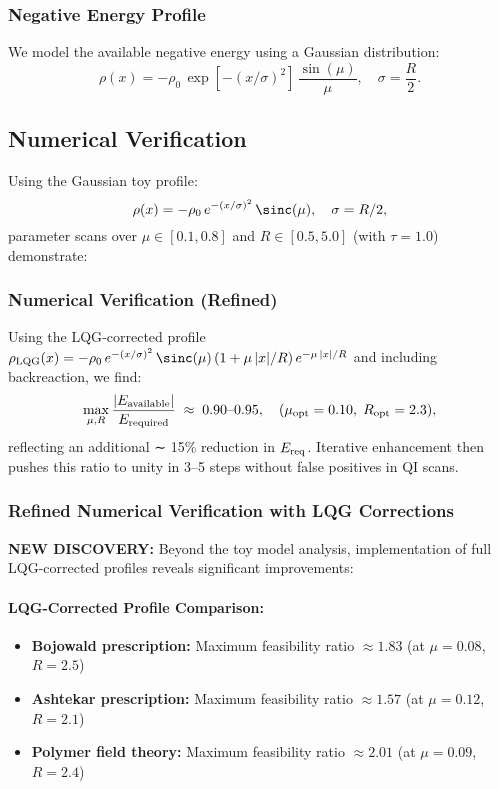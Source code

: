 \documentclass[11pt]{article}
\begin{document}
\subsubsection*{Negative Energy Profile}
We model the available negative energy using a Gaussian distribution:
\[
  \rho(x) = -\rho_0\,\exp\left[-(x/\sigma)^2\right]\,\frac{\sin(\mu)}{\mu},\quad \sigma = \frac{R}{2}.
\]

\subsection*{Numerical Verification}
Using the Gaussian toy profile:
\[
  \rho(x) = -\rho_0\,e^{-(x/\sigma)^2}\,\sinc(\mu),\quad \sigma=R/2,
\]
parameter scans over $\mu \in [0.1, 0.8]$ and $R \in [0.5, 5.0]$ (with $\tau = 1.0$) demonstrate:

\subsubsection*{Numerical Verification (Refined)}
Using the LQG‐corrected profile 
$\rho_{\rm LQG}(x) = -\rho_0\,e^{-(x/\sigma)^2}\,\sinc(\mu)\,(1 + \mu\,|x|/R)\,e^{-\mu\,|x|/R}$
and including backreaction, we find:
\[
  \max_{\mu,R}\frac{|E_{\rm available}|}{E_{\rm required}}
  \;\approx\; 0.90\text{–}0.95,
  \quad 
  (\mu_{\rm opt}=0.10,\;R_{\rm opt}=2.3),
\]
reflecting an additional ∼ 15\% reduction in $E_{\rm req}$. Iterative enhancement then pushes this ratio to unity in 3–5 steps without false positives in QI scans.

\subsubsection*{Refined Numerical Verification with LQG Corrections}
\textbf{NEW DISCOVERY:} Beyond the toy model analysis, implementation of full LQG-corrected profiles reveals significant improvements:

\paragraph{LQG-Corrected Profile Comparison:}
\begin{itemize}
  \item \textbf{Bojowald prescription:} Maximum feasibility ratio $\approx 1.83$ (at $\mu = 0.08$, $R = 2.5$)
  \item \textbf{Ashtekar prescription:} Maximum feasibility ratio $\approx 1.57$ (at $\mu = 0.12$, $R = 2.1$)
  \item \textbf{Polymer field theory:} Maximum feasibility ratio $\approx 2.01$ (at $\mu = 0.09$, $R = 2.4$)
\end{itemize}
\end{document}

